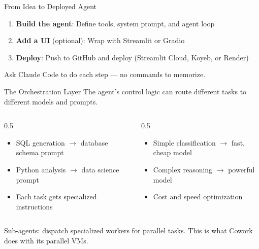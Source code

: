 \documentclass[aspectratio=169]{beamer}
\begin{document}
\begin{frame}{From Idea to Deployed Agent}
\begin{enumerate}
  \item \textbf{Build the agent}: Define tools, system prompt, and agent loop
  \item \textbf{Add a UI} (optional): Wrap with Streamlit or Gradio
  \item \textbf{Deploy}: Push to GitHub and deploy (Streamlit Cloud, Koyeb, or Render)
\end{enumerate}
\vspace{0.3cm}
\begin{center}
\alert{Ask Claude Code to do each step --- no commands to memorize.}
\end{center}
\end{frame}

\begin{frame}{The Orchestration Layer}
The agent's control logic can route different tasks to different models and prompts.
\vspace{0.3cm}
\begin{columns}[T]
\begin{column}{0.5\textwidth}
\begin{shadedbox}[title=\textbf{Different Prompts}]
\begin{itemize}\small
  \item SQL generation $\rightarrow$ database schema prompt
  \item Python analysis $\rightarrow$ data science prompt
  \item Each task gets specialized instructions
\end{itemize}
\end{shadedbox}
\end{column}
\begin{column}{0.5\textwidth}
\begin{shadedbox}[title=\textbf{Different Models}]
\begin{itemize}\small
  \item Simple classification $\rightarrow$ fast, cheap model
  \item Complex reasoning $\rightarrow$ powerful model
  \item Cost and speed optimization
\end{itemize}
\end{shadedbox}
\end{column}
\end{columns}
\vspace{0.3cm}
Sub-agents: dispatch specialized workers for parallel tasks. This is what Cowork does with its parallel VMs.
\end{frame}
\end{document}

